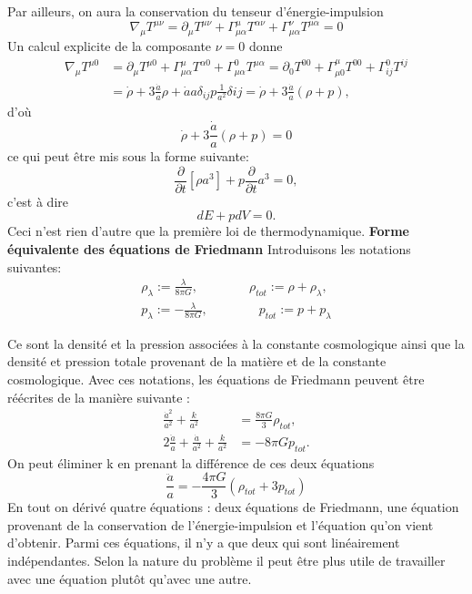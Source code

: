 \documentclass[a4paper,12pt]{report}
\theoremstyle{plain}
\theoremstyle{plain}
\begin{document}
Par ailleurs, on aura la conservation du tenseur d'\'energie-impulsion 
\begin{equation}
\nabla_\mu T^{\mu \nu } = \partial_\mu T^{\mu\nu } + \Gamma_{\mu \alpha } ^\mu T^{\alpha \nu } + \Gamma_{\mu \alpha } ^\nu T^{\mu \alpha } =0
\end{equation}
Un calcul explicite de la composante $\nu =0$ donne 
\begin{eqnarray}
\nabla_\mu T^{\mu 0} &= \partial_\mu T^{\mu 0} + \Gamma_{\mu \alpha } ^\mu T^{\alpha 0} + \Gamma_{\mu \alpha }^0 T^{\mu \alpha } = \partial_0 T^{00} + \Gamma_{\mu 0}^\mu T^{00} + \Gamma_{ij}^0T^{ij}  \nonumber\\
&= \dot{\rho} +3 \frac{\dot{a}}{a} \rho + \dot{a}a \delta_{ij} p \frac{1}{a^2} \delta{ij} = \dot{\rho} + 3 \frac{\dot{a}}{a}\left( \rho +p \right) \nonumber ,  
\end{eqnarray}
d'o\`{u} 
\begin{equation}
\dot{\rho} + 3 \frac{\dot{a}}{a} \left(\rho +p \right) =0
\end{equation} 
ce qui peut \^etre mis sous la forme suivante:
\begin{equation}
   \frac{\partial}{\partial t} \left[\rho a^3 \right] +p \frac{\partial }{\partial t} a^3 =0,
\end{equation} 
c'est \`a dire 
\begin{equation}
dE+pdV=0.
\end{equation}
Ceci n'est rien d'autre que la premi\`ere loi de thermodynamique. 
\textbf{Forme \'equivalente des \'equations de Friedmann} 
Introduisons les notations suivantes:
\begin{eqnarray}
  \rho_\lambda := \frac{\lambda}{8\pi G} , \qquad \qquad \rho_{tot} := \rho + \rho_\lambda , \nonumber\\
  p_\lambda := - \frac{\lambda }{8\pi G} , \qquad \qquad p_{tot} := p+p_\lambda \nonumber
\end{eqnarray}

Ce sont la densit\'e et la pression associ\'ees \`a la constante cosmologique ainsi que la densit\'e et pression  totale provenant de la mati\`ere et de la constante cosmologique. Avec ces notations, les \'equations de Friedmann peuvent \^etre r\'e\'ecrites de la mani\`ere suivante :
\begin{eqnarray}
\frac{\dot{a}^2}{a^2} + \frac{k}{a^2}&=\frac{8\pi G}{3} \rho_{tot},\\
2\frac{\ddot{a}}{a} + \frac{\dot{a}}{a^2} + \frac{k}{a^2}&=-8\pi G p_{{tot}}.
\end{eqnarray}
On peut \'eliminer k en prenant la diff\'erence de ces deux \'equations 
\begin{equation}
\frac{\ddot{a}}{a}=-\frac{4\pi G}{3}\left(\rho_{tot}+3p_{tot} \right) 
\end{equation} 
En tout on d\'eriv\'e quatre \'equations : deux \'equations de Friedmann, une \'equation provenant de la conservation de l'\'energie-impulsion et l'\'equation qu'on vient d'obtenir. Parmi ces \'equations, il n'y a que deux qui sont lin\'eairement ind\'ependantes. Selon la nature du probl\`eme il peut \^etre plus utile de travailler avec une \'equation plut\^ot qu'avec une autre.\\
\end{document}

